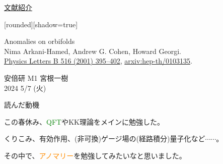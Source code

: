 \documentclass[
  unicode,a4paper,10pt,
  xcolor = {dvipsnames,svgnames},
  hyperref ={colorlinks=true,citecolor=Navy,linkcolor=NavyBlue,urlcolor=purple},
  ja=standard,lualatex
]{beamer}
\begin{document}
\nocite{Arkani-Hamed:2001uol}

\begin{frame}

  \begin{center}
    \uline{文献紹介}
  \end{center}

  [rounded][shadow=true]
  \begin{block}{}
    \vspace*{5pt}

    \centering\Large
    Anomalies on orbifolds
    \\
    \normalsize
    Nima Arkani-Hamed, Andrew G. Cohen, Howard Georgi.
    \\
    \small
    \href{https://doi.org/10.1016/S0370-2693(01)00946-7}{Physics Letters B 516 (2001) 395–402},
    \href{https://doi.org/10.48550/arXiv.hep-th/0103135}{arxiv:hep-th/0103135}.

    \vspace*{5pt}
  \end{block}

  \begin{center}
    安倍研 M1 宮根一樹\\
    2024 5/7 (火)
  \end{center}
\end{frame}


\begin{frame}{読んだ動機}

  この春休み、\textcolor{Green}{QFT}やKK理論をメインに勉強した。

  \vspace*{5pt}
  
  くりこみ、有効作用、(非可換)ゲージ場の(経路積分)量子化など$\cdots\cdots$。

  \vspace*{5pt}
  \pause
  
  その中で、\textcolor{DarkOrange}{アノマリー}を勉強してみたいなと思いました。

\end{frame}
\end{document}
